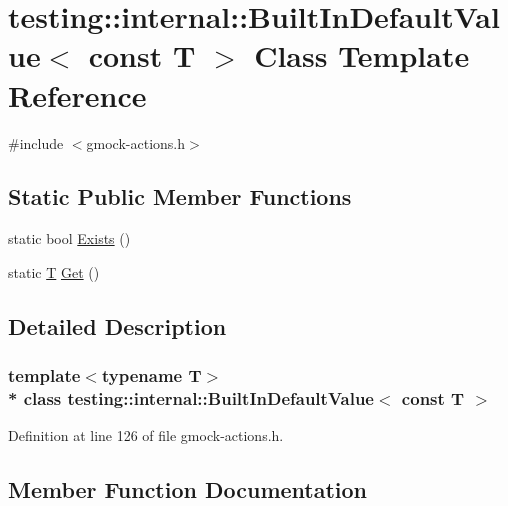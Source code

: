 \hypertarget{classtesting_1_1internal_1_1_built_in_default_value_3_01const_01_t_01_4}{}\section{testing\+:\+:internal\+:\+:Built\+In\+Default\+Value$<$ const T $>$ Class Template Reference}
\label{classtesting_1_1internal_1_1_built_in_default_value_3_01const_01_t_01_4}


{\ttfamily \#include $<$gmock-\/actions.\+h$>$}

\subsection*{Static Public Member Functions}
\begin{DoxyCompactItemize}
\item 
static bool \hyperlink{classtesting_1_1internal_1_1_built_in_default_value_3_01const_01_t_01_4_a1814803ec5dcc660ee1f1092a96b79fa}{Exists} ()
\item 
static \hyperlink{functions__7_8js_adf1f3edb9115acb0a1e04209b7a9937b}{T} \hyperlink{classtesting_1_1internal_1_1_built_in_default_value_3_01const_01_t_01_4_a5996754952ecbcc5da77a2cebd4722de}{Get} ()
\end{DoxyCompactItemize}


\subsection{Detailed Description}
\subsubsection*{template$<$typename T$>$\\*
class testing\+::internal\+::\+Built\+In\+Default\+Value$<$ const T $>$}



Definition at line 126 of file gmock-\/actions.\+h.



\subsection{Member Function Documentation}
